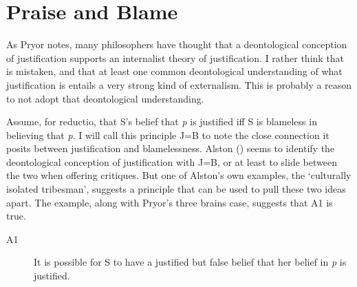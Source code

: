 \documentclass[
  11pt,
  letterpaper,
  DIV=11,
  numbers=noendperiod,
  oneside]{scrartcl}
\begin{document}
\section{Praise and Blame}\label{praise-and-blame}

As Pryor notes, many philosophers have thought that a deontological
conception of justification supports an internalist theory of
justification. I rather think that is mistaken, and that at least one
common deontological understanding of what justification is entails a
very strong kind of externalism. This is probably a reason to not adopt
that deontological understanding.

Assume, for reductio, that S's belief that \emph{p} is justified iff S
is blameless in believing that \emph{p}. I will call this principle J=B
to note the close connection it posits between justification and
blamelessness. Alston () seems to
identify the deontological conception of justification with J=B, or at
least to slide between the two when offering critiques. But one of
Alston's own examples, the `culturally isolated tribesman', suggests a
principle that can be used to pull these two ideas apart. The example,
along with Pryor's three brains case, suggests that A1 is true.

\begin{description}
\item[A1]
It is possible for S to have a justified but false belief that her
belief in \emph{p} is justified.
\end{description}
\end{document}

